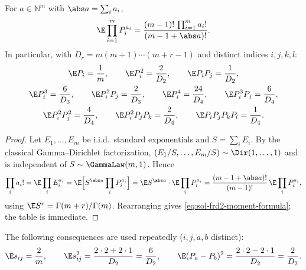 \documentclass[../main.tex]{subfiles}
\begin{document}
\begin{lemma}
\label{lem:sol-frd2-moments}
For $a\in\mathbb N^m$ with $\abs a=\sum_ia_i$,
\begin{equation}
  \E\prod_{i=1}^mP_i^{a_i}
  =\frac{(m-1)!\,\prod_{i=1}^ma_i!}{(m-1+\abs a)!}.
  \label{eq:sol-frd2-moment-formula}
\end{equation}
In particular, with $D_r=m(m+1)\cdots(m+r-1)$ and distinct indices $i,j,k,l$:
\begin{equation}
\begin{gathered}
  \E P_i=\frac1m,\qquad
  \E P_i^2=\frac2{D_2},\qquad
  \E P_iP_j=\frac1{D_2},\\
  \E P_i^3=\frac6{D_3},\qquad
  \E P_i^2P_j=\frac2{D_3},\qquad
  \E P_i^4=\frac{24}{D_4},\qquad
  \E P_i^3P_j=\frac6{D_4},\\
  \E P_i^2P_j^2=\frac4{D_4},\qquad
  \E P_i^2P_jP_k=\frac2{D_4},\qquad
  \E P_iP_jP_kP_l=\frac1{D_4}.
\end{gathered}
  \label{eq:sol-frd2-moment-table}
\end{equation}
\end{lemma}

\begin{proof}
Let $E_1,\dots,E_m$ be i.i.d.\ standard exponentials and $S=\sum_iE_i$.  By the
classical Gamma--Dirichlet factorization, $(E_1/S,\dots,E_m/S)\sim\Dir(1,\dots,1)$ and
is independent of $S\sim\GammaLaw(m,1)$.  Hence
\[
  \prod_ia_i!
  =\E\prod_iE_i^{a_i}
  =\E\Bigl[S^{\abs a}\prod_iP_i^{a_i}\Bigr]
  =\E S^{\abs a}\cdot\E\prod_iP_i^{a_i}
  =\frac{(m-1+\abs a)!}{(m-1)!}\,\E\prod_iP_i^{a_i},
\]
using $\E S^{r}=\Gamma(m+r)/\Gamma(m)$.  Rearranging gives
\eqref{eq:sol-frd2-moment-formula}; the table is immediate.
\end{proof}

The following consequences are used repeatedly ($i,j,a,b$ distinct):
\begin{equation}
  \E s_{ij}=\frac2m,\qquad
  \E s_{ij}^2=\frac{2\cdot2+2\cdot1}{D_2}=\frac6{D_2},\qquad
  \E(P_a-P_b)^2=\frac{2\cdot2-2\cdot1}{D_2}=\frac2{D_2}.
  \label{eq:sol-frd2-small-moments}
\end{equation}
\end{document}
